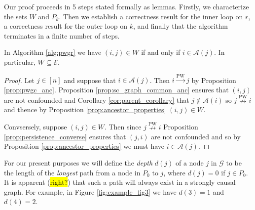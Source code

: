 \documentclass[12pt]{article}
\def\pwgc{\overset{\text{PW}}{\rightarrow}}  %
\def\npwgc{\overset{\text{PW}}{\nrightarrow}}  %
\def\gcg{\mathcal{G}}  %
\def\gcge{\mathcal{E}}  %
\newcommand{\anc}[1]{\mathcal{A}(#1)}  %
\begin{document}


Our proof proceeds in 5 steps stated formally as lemmas.  Firstly, we
characterize the sets $W$ and $P_k$.  Then we establish a correctness
result for the inner loop on $r$, a correctness result for the outer
loop on $k$, and finally that the algorithm terminates in a finite
number of steps.

\begin{lemma}
  \label{lem:W_subset_E}
  In Algorithm \ref{alg:pwgr} we have
  $(i, j) \in W$ if and only if $i \in \anc{j}$.  In particular,
  $W \subseteq \gcge$.
\end{lemma}
\begin{proof}
  Let $j \in [n]$ and suppose that $i \in \anc{j}$.  Then $i \pwgc j$
  by Proposition \ref{prop:pwgc_anc}.  Proposition
  \ref{prop:sc_graph_common_anc} ensures that $(i, j)$ are not
  confounded and Corollary \ref{cor:parent_corollary} that
  $j \not\in \anc{i}$ so $j \npwgc i$ and thence by Proposition
  \ref{prop:ancestor_properties} $(i, j) \in W$.

  Convsersely, suppose $(i, j) \in W$.  Then since $j \npwgc i$
  Proposition \ref{prop:persistence_converse} ensures that $(j, i)$
  are not confounded and so by Proposition \ref{prop:ancestor_properties}
  we must have $i \in \anc{j}$.
\end{proof}

\begin{definition}[Depth]
  For our present purposes we will define the \textit{depth} $d(j)$ of
  a node $j$ in $\gcg$ to be the length of the \textit{longest} path
  from a node in $P_0$ to $j$, where $d(j) = 0$ if $j \in P_0$.  It is
  apparent (\hl{right?}) that such a path will always exist in a
  strongly causal graph.  For example, in Figure
  \ref{fig:example_fig3} we have $d(3) = 1$ and $d(4) = 2$.
\end{definition}
\end{document}
